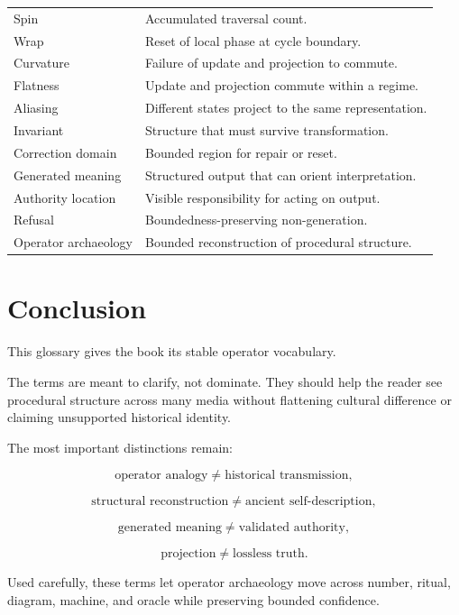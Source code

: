 \documentclass[11pt]{book}
\begin{document}
\begin{center}
\begin{tabular}{p{} p{}}
Spin & Accumulated traversal count. \\
Wrap & Reset of local phase at cycle boundary. \\
Curvature & Failure of update and projection to commute. \\
Flatness & Update and projection commute within a regime. \\
Aliasing & Different states project to the same representation. \\
Invariant & Structure that must survive transformation. \\
Correction domain & Bounded region for repair or reset. \\
Generated meaning & Structured output that can orient interpretation. \\
Authority location & Visible responsibility for acting on output. \\
Refusal & Boundedness-preserving non-generation. \\
Operator archaeology & Bounded reconstruction of procedural structure. \\
\hline
\end{tabular}
\end{center}

\section{Conclusion}

This glossary gives the book its stable operator vocabulary.

The terms are meant to clarify, not dominate. They should help the reader see procedural structure across many media without flattening cultural difference or claiming unsupported historical identity.

The most important distinctions remain:

\[
\text{operator analogy} \neq \text{historical transmission},
\]

\[
\text{structural reconstruction} \neq \text{ancient self-description},
\]

\[
\text{generated meaning} \neq \text{validated authority},
\]

\[
\text{projection} \neq \text{lossless truth}.
\]

Used carefully, these terms let operator archaeology move across number, ritual, diagram, machine, and oracle while preserving bounded confidence.

\backmatter
\end{document}

